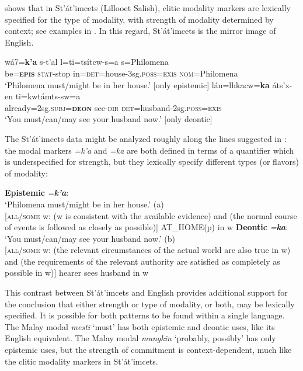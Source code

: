 \citet{Matthewson2010} shows that in St’át’imcets (Lillooet Salish), clitic modality markers are lexically specified for the type of modality, with strength of modality determined by context; see examples in . In this regard, St’át’imcets is the mirror image of English.


\ea
\ea  \gll wá7=\textbf{k’a}  s-t’al  l=ti=tsítcw-s=a  s=Philomena\\
be=\textbf{\textsc{epis}}  \textsc{stat}-stop  in=\textsc{det}=house-3sg.\textsc{poss}=\textsc{exis}  \textsc{nom}=Philomena\\
\glt ‘Philomena must/might be in her house.’   [only epistemic]
\ex \gll lán=lhkacw=\textbf{ka}  áts’x-en  ti=kwtámts-sw=a\\
already=2sg.\textsc{subj}=\textbf{\textsc{deon}}  see-\textsc{dir}  \textsc{det}=husband-2sg.\textsc{poss}=\textsc{exis}\\
\glt ‘You must/can/may see your husband now.’   [only deontic]
\z \z


The St’át’imcets data might be analyzed roughly along the lines suggested in : the modal markers \textit{=k’a} and \textit{=ka} are both defined in terms of a quantifier which is underspecified for strength, but they lexically specify different types (or flavors) of modality:


\ea
\ea
\textbf{Epistemic} \textit{=}\textbf{\textit{k’a}}:\\
‘Philomena must/might be in her house.’ (a)\\
{}[\textsc{all/some} w: (w is consistent with the available evidence) and (the normal course of events is followed as closely as possible)] AT\_HOME(p) in w
\ex 
 \textbf{Deontic} \textit{=}\textbf{\textit{ka}}:\\
‘You must/can/may see your husband now.’ (b)\\
{}[\textsc{all/some} w: (the relevant circumstances of the actual world are also true in w) and (the requirements of the relevant authority are satisfied as completely as possible in w)] hearer sees husband in w
\z \z


This contrast between St’át’imcets and English provides additional support for the conclusion that either strength or type of modality, or both, may be lexically specified. It is possible for both patterns to be found within a single language. The Malay modal \textit{mesti} ‘must’ has both epistemic and deontic uses, like its English equivalent. The Malay modal \textit{mungkin} ‘probably, possibly’ has only epistemic uses, but the strength of commitment is context-dependent, much like the clitic modality markers in St’át’imcets.



